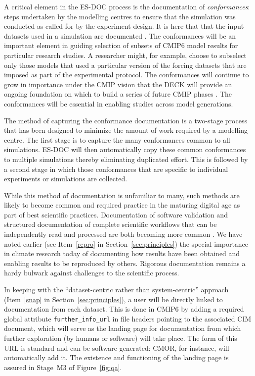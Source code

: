 \documentclass[gmd,manuscript]{copernicus}
\begin{document}
A critical element in the ES-DOC process is the documentation of
\emph{conformances}: steps undertaken by the modelling centres to
ensure that the simulation was conducted as called for by the
experiment design. It is here that that the input datasets used in a
simulation are documented \citep[e.g., the version of each of the
forcing datasets, see][]{ref:duracketal2018}. The conformances will be
an important element in guiding selection of subsets of CMIP6 model
results for particular research studies. A researcher might, for
example, choose to subselect only those models that used a particular
version of the forcing datasets that are imposed as part of the
experimental protocol. The conformances will continue to grow in
importance under the CMIP vision that the DECK will provide an ongoing
foundation on which to build a series of future CMIP phases
\citep[shown schematically in Figure~1 of][]{ref:eyringetal2016a}. The
conformances will be essential in enabling studies across model
generations.

The method of capturing the conformance documentation is a two-stage
process that has been designed to minimize the amount of work required
by a modelling centre. The first stage is to capture the many
conformances common to all simulations. ES-DOC will then automatically
copy these common conformances to multiple simulations thereby
eliminating duplicated effort. This is followed by a second stage in
which those conformances that are specific to individual experiments
or simulations are collected.

While this method of documentation is unfamiliar to many, such methods
are likely to become common and required practice in the maturing
digital age as part of best scientific practices. Documentation of
software validation \citep[see e.g][]{ref:peng2011} and structured
documentation of complete scientific workflows that can be
independently read and processed are both becoming more common
\citep[see the special issue on the ``Geoscience Paper of the
Future'', ][]{ref:davidetal2016}. We have noted earlier (see
Item~\ref{repro} in Section~\ref{sec:principles}) the special
importance in climate research today of documenting how results have
been obtained and enabling results to be reproduced by others.
Rigorous documentation remains a hardy bulwark against challenges to
the scientific process.

In keeping with the ``dataset-centric rather than system-centric''
approach (Item~\ref{snap} in Section~\ref{sec:principles}), a user
will be directly linked to documentation from each dataset. This is
done in CMIP6 by adding a required global attribute
\texttt{further\_info\_url} in file headers pointing to the associated
CIM document, which will serve as the landing page for documentation
from which further exploration (by humans or software) will take
place. The form of this URL is standard and can be software-generated:
CMOR, for instance, will automatically add it. The existence and
functioning of the landing page is assured in Stage~M3 of
Figure~\ref{fig:qa}.
\end{document}
